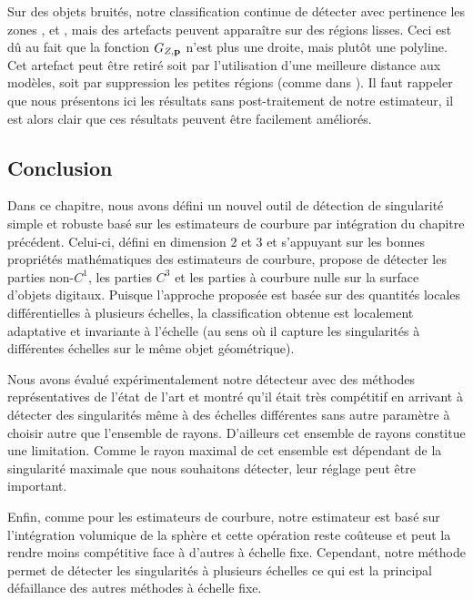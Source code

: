 Sur des objets bruités, notre classification continue de détecter avec
pertinence les zones \featedge, \featsmooth et \featflat, mais des artefacts
peuvent apparaître sur des régions lisses. Ceci est dû au fait que la fonction
$G_{Z,\mathbf{p}}$ n'est plus une droite, mais plutôt une polyline. Cet artefact peut
être retiré soit par l'utilisation d'une meilleure distance aux modèles, soit
par suppression les petites régions \featedge (comme dans \cite{Park2012}). Il
faut rappeler que nous présentons ici les résultats sans post-traitement de
notre estimateur, il est alors clair que ces résultats peuvent être facilement
améliorés.
%
\subsection{Conclusion}
%
Dans ce chapitre, nous avons défini un nouvel outil de détection de singularité
simple et robuste basé sur les estimateurs de courbure par intégration du
chapitre précédent. Celui-ci, défini en dimension 2 et 3 et s'appuyant sur les
bonnes propriétés mathématiques des estimateurs de courbure, propose de détecter
les parties non-$C^1$, les parties $C^3$ et les parties à courbure nulle sur la
surface d'objets digitaux. Puisque l'approche proposée est basée sur des
quantités locales différentielles à plusieurs échelles, la classification
obtenue est localement adaptative et invariante à l'échelle (au sens où il
capture les singularités à différentes échelles sur le même objet géométrique).


Nous avons évalué expérimentalement notre détecteur avec des méthodes
représentatives de l'état de l'art et montré qu'il était très compétitif en
arrivant à détecter des singularités même à des échelles différentes sans autre
paramètre à choisir autre que l'ensemble de rayons. D'ailleurs cet ensemble de
rayons constitue une limitation. Comme le rayon maximal de cet ensemble est
dépendant de la singularité maximale que nous souhaitons détecter, leur réglage
peut être important.


Enfin, comme pour les estimateurs de courbure, notre estimateur est basé sur
l'intégration volumique de la sphère et cette opération reste coûteuse et peut
la rendre moins compétitive face à d'autres à échelle fixe. Cependant, notre
méthode permet de détecter les singularités à plusieurs échelles ce qui est la
principal défaillance des autres méthodes à échelle fixe.
